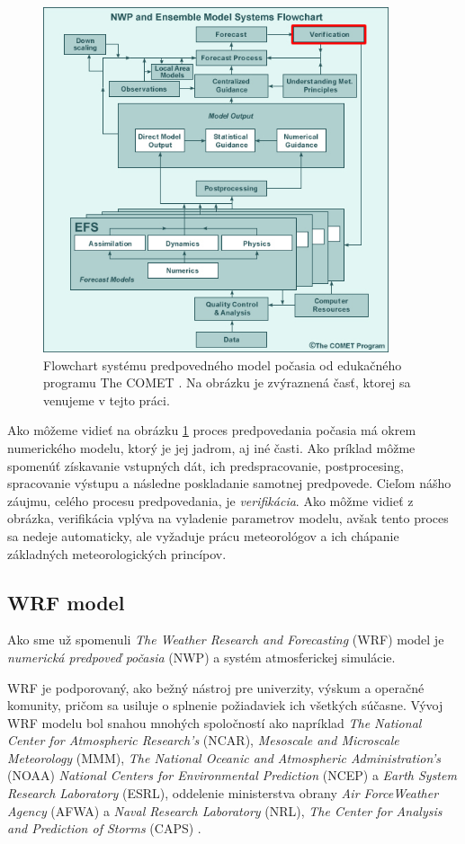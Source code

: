 \begin{figure}
	\centering
	\includegraphics[width = 4in]{ForecastModelDiagramNew}
	\caption{Flowchart systému predpovedného model počasia od edukačného programu The COMET \cite{Comet}. Na obrázku je zvýraznená časť, ktorej sa venujeme v tejto práci.}
	\label{fig:fcstmodel}
\end{figure}

Ako môžeme vidieť na obrázku \ref{fig:fcstmodel} proces predpovedania počasia má okrem numerického modelu, ktorý je jej jadrom, aj iné časti. Ako príklad môžme spomenúť získavanie vstupných dát, ich predspracovanie, postprocesing, spracovanie výstupu a následne poskladanie samotnej predpovede. Cieľom nášho záujmu, celého procesu predpovedania, je \textit{verifikácia}. Ako môžme vidieť z obrázka, verifikácia vplýva na vyladenie parametrov modelu, avšak tento proces sa nedeje automaticky, ale vyžaduje prácu meteorológov a ich chápanie základných meteorologických princípov.


\subsection{WRF model}
Ako sme už spomenuli \textit{The Weather Research and Forecasting} (WRF) model je \textit{numerická predpoveď počasia} (NWP) a systém atmosferickej simulácie.

WRF je podporovaný, ako bežný nástroj pre univerzity, výskum a operačné komunity, pričom sa usiluje o splnenie požiadaviek ich všetkých súčasne.
Vývoj WRF modelu bol snahou mnohých spoločností ako napríklad \textit{The National Center for Atmospheric Research’s} (NCAR), \textit{Mesoscale and Microscale
Meteorology} (MMM), \textit{The National Oceanic and Atmospheric Administration’s} (NOAA) \textit{National Centers for Environmental Prediction} (NCEP) a \textit{Earth System Research Laboratory} (ESRL), oddelenie ministerstva obrany \textit{Air ForceWeather Agency} (AFWA) a \textit{Naval
Research Laboratory} (NRL), \textit{The Center for Analysis and Prediction of Storms} (CAPS) \cite{WRF}. 

